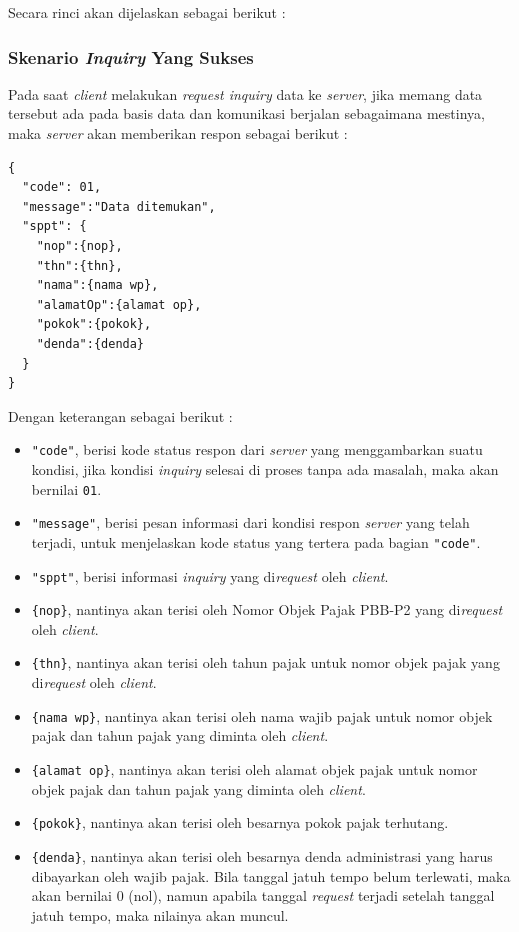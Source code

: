 \documentclass[pdftex,12pt, oneside]{article}
\begin{document}
Secara rinci akan dijelaskan sebagai berikut :

\subsubsection{Skenario \textit{Inquiry} Yang Sukses}

  Pada saat \textit{client} melakukan \textit{request inquiry} data ke \textit{server}, jika memang data tersebut ada pada basis data dan komunikasi berjalan sebagaimana mestinya, maka \textit{server} akan memberikan respon sebagai berikut :
  
  \begin{lstlisting}
{
  "code": 01,
  "message":"Data ditemukan",
  "sppt": {
    "nop":{nop},
    "thn":{thn},
    "nama":{nama wp},
    "alamatOp":{alamat op},
    "pokok":{pokok},
    "denda":{denda}
  }
}
  \end{lstlisting}
  
  Dengan keterangan sebagai berikut :
  
  \begin{itemize}
    \item \texttt{"code"}, berisi kode status respon dari \textit{server} yang menggambarkan suatu kondisi, jika kondisi \textit{inquiry} selesai di proses tanpa ada masalah, maka akan bernilai \texttt{01}.
    
    \item \texttt{"message"}, berisi pesan informasi dari kondisi respon \textit{server} yang telah terjadi, untuk menjelaskan kode status yang tertera pada bagian \texttt{"code"}.
    
    \item \texttt{"sppt"}, berisi informasi \textit{inquiry} yang di\textit{request} oleh \textit{client}.
    
    \item \texttt{\{nop\}}, nantinya akan terisi oleh Nomor Objek Pajak PBB-P2 yang di\textit{request} oleh \textit{client}.
    
    \item \texttt{\{thn\}}, nantinya akan terisi oleh tahun pajak untuk nomor objek pajak yang di\textit{request} oleh \textit{client}.
    
    \item \texttt{\{nama wp\}}, nantinya akan terisi oleh nama wajib pajak untuk nomor objek pajak dan tahun pajak yang diminta oleh \textit{client}.
    
    \item \texttt{\{alamat op\}}, nantinya akan terisi oleh alamat objek pajak untuk nomor objek pajak dan tahun pajak yang diminta oleh \textit{client}.
    
    \item \texttt{\{pokok\}}, nantinya akan terisi oleh besarnya pokok pajak terhutang.
    
    \item \texttt{\{denda\}}, nantinya akan terisi oleh besarnya denda administrasi yang harus dibayarkan oleh wajib pajak. Bila tanggal jatuh tempo belum terlewati, maka akan bernilai 0 (nol), namun apabila tanggal \textit{request} terjadi setelah tanggal jatuh tempo, maka nilainya akan muncul.
  \end{itemize}
\end{document}
